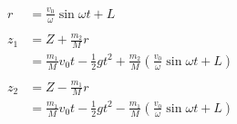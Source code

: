 \documentclass{article}
\begin{document}
\begin{align*}
  r                                                  & = \frac{v_0}{\omega} \sin \omega t + L                                                                        \\ \\
  z_1                                                & = Z + \frac{m_2}{M} r                                                                                         \\
                                                     & = \frac{m_1}{M} v_0 t - \frac{1}{2} g t^2 + \frac{m_2}{M} \left( \frac{v_0}{\omega} \sin \omega t + L \right) \\ \\
  z_2                                                & = Z - \frac{m_1}{M} r                                                                                         \\
                                                     & = \frac{m_1}{M} v_0 t - \frac{1}{2} g t^2 - \frac{m_1}{M} \left( \frac{v_0}{\omega} \sin \omega t + L \right)
\end{align*}

\setcounter{subsection}{6}
\subsection{}
\end{document}
